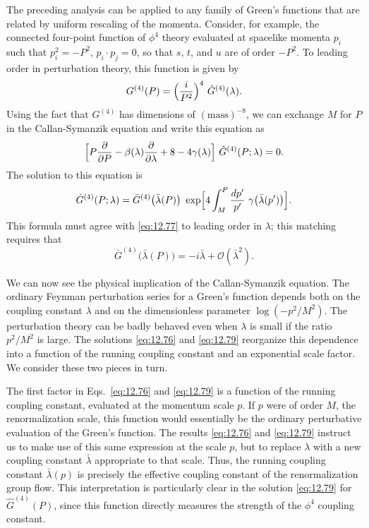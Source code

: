 The preceding analysis can be applied to any family of Green's functions that
are related by uniform rescaling of the momenta.  Consider, for example, the
connected four-point function of $\phi^4$ theory evaluated at spacelike
momenta $p_i$ such that $p_i^2 = -P^2$, $p_i\cdot p_j = 0$, so that $s$, $t$,
and $u$ are of order $-P^2$.  To leading order in perturbation theory, this
function is given by
\begin{equation}
  G^{(4)}(P) = \Bigl( \frac{i}{P^2} \Bigr)^4\ \hat{G}^{(4)}(\lambda) .
  \label{eq:12.77}
\end{equation}
Using the fact that $G^{(4)}$ has dimensions of $(\mathrm{mass})^{-8}$, we can
exchange $M$ for $P$ in the Callan-Symanzik equation and write this equation
as
\begin{equation}
  \Bigl[ P\frac{\partial}{\partial P} - \beta(\lambda)\frac{\partial}
    {\partial\lambda} + 8 - 4\gamma(\lambda) \Bigr]\ \hat{G}^{(4)}(P; \lambda)
  = 0 .
  \label{eq:12.78}
\end{equation}
The solution to this equation is
\begin{equation}
  \hat{G}^{(4)}(P; \lambda) = \bar{G}^{(4)}\bigl( \bar{\lambda}(P) \bigr)\
    \exp\Bigl[ 4\int_{M}^{P} \frac{dp'}{p'}\ \gamma\bigl(
      \bar{\lambda}(p') \bigr) \Bigr] .
  \label{eq:12.79}
\end{equation}
This formula must agree with \eqref{eq:12.77} to leading order in $\lambda$;
this matching requires that
\begin{equation}
  \bar{G}^{(4)}\bigl( \bar{\lambda}(P) \bigr) = -i\bar{\lambda}
    + \mathcal{O}(\bar{\lambda}^2) .
  \label{eq:12.80}
\end{equation}

We can now see the physical implication of the Callan-Symanzik equation.
The ordinary Feynman perturbation series for a Green's function depends both
on the coupling constant $\lambda$ and on the dimensionless parameter
$\log(-p^2/M^2)$.  The perturbation theory can be badly behaved even when
$\lambda$ is small if the ratio $p^2/M^2$ is large.  The solutions
\eqref{eq:12.76} and \eqref{eq:12.79} reorganize this dependence into a
function of the running coupling constant and an exponential scale factor.
We consider these two pieces in turn.

The first factor in Eqs.~\eqref{eq:12.76} and \eqref{eq:12.79} is a function
of the running coupling constant, evaluated at the momentum scale $p$.  If
$p$ were of order $M$, the renormalization scale, this function would
essentially be the ordinary perturbative evaluation of the Green's function.
The results \eqref{eq:12.76} and \eqref{eq:12.79} instruct us to make use of
this same expression at the scale $p$, but to replace $\lambda$ with a new
coupling constant $\bar{\lambda}$ appropriate to that scale.  Thus, the
running coupling constant $\bar{\lambda}(p)$ is precisely the effective
coupling constant of the renormalization group flow.  This interpretation is
particularly clear in the solution \eqref{eq:12.79} for $\hat{G}^{(4)}(P)$,
since this function directly measures the strength of the $\phi^4$ coupling
constant.

